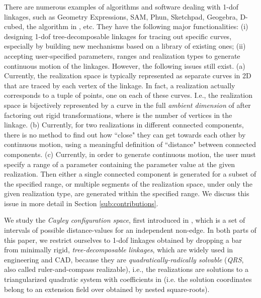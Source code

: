 \documentclass[secthm,amsthm,english]{article}
\theoremstyle{definition}
\theoremstyle{remark}
\begin{document}
There are numerous examples of algorithms and software dealing with 1-dof linkages, 
such as Geometry Expressions, SAM,  Phun, Sketchpad, Geogebra, D-cubed, 
the algorithm in \cite{bib:hidalgo2011reachability}, etc. 
They have the following major functionalities: 
(i) designing 1-dof tree-decomposable linkages for tracing out specific curves, 
especially by building new mechanisms based on a library of existing ones;
(ii) accepting user-specified parameters, ranges and realization types to generate 
continuous motion of the linkages. 
However, the following issues still exist. 
(a) Currently, 
the realization space is typically represented as separate curves in 2D that are 
traced by each vertex of the linkage. 
In fact, 
a realization actually corresponds to a tuple of points, one on each of these curves.
I.e., the realization space is bijectively represented by a curve in the full \emph{ambient dimension} of  after factoring out rigid transformations, 
where  is the number of vertices in the linkage. 
(b) Currently, 
for two realizations in different connected components, 
there is no method to find out how ``close" they can get towards each other by continuous motion, 
using a meaningful definition of ``distance" between connected components. 
(c) Currently, in order to generate continuous motion, 
the user must specify a range of a parameter containing the parameter value at the given realization.
Then either a single connected component is generated
for a subset of the specified range, 
or multiple segments of the realization space, under only the given realization type,  
are generated within the specified range. 
We discuss this issue in more detail in Section \ref{sub:contributions}.


\medskip


We study the \emph{Cayley configuration space}, first introduced in \cite{bib:GaoSi05,bib:GaoSitharam08a},
which is a set of intervals of possible distance-values for an independent non-edge. 
In both parts of this paper, we restrict ourselves to 1-dof linkages 
obtained by dropping a bar from minimally rigid, \emph{tree-decomposable linkages},
which are widely used in engineering and CAD, 
because they are \emph{quadratically-radically solvable} (\emph{QRS}, also called ruler-and-compass realizable),
i.e., the realizations are solutions to a
triangularized quadratic system with coefficients in 
(i.e. the solution coordinates belong to an extension field over
 obtained by nested square-roots). 
\end{document}
